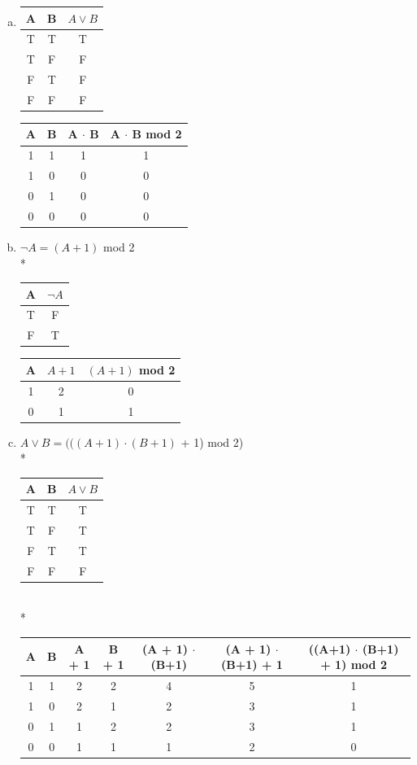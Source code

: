 \documentclass[12pt]{article}
\begin{document}
\begin{enumerate}[(a)]
\item 
\begin{tabular}{c|c|c}
A & B & $A \lor B$\\
\hline
T & T & T\\
T & F & F\\
F & T & F\\
F & F & F\\
\end{tabular}
\hspace{1in}
\begin{tabular}{c|c|c|c}
A & B & A $\cdot$ B & A $\cdot$ B mod 2\\
\hline
1 & 1 & 1 & 1\\
1 & 0 & 0 & 0\\
0 & 1 & 0 & 0\\
0 & 0 & 0 & 0\\
\end{tabular}
\medskip
\item $\neg A = (A + 1)$ mod 2
\vspace{0.1in}
\\*\begin{tabular}{c|c}
A & $\neg A$\\
\hline
T & F\\
F & T\\
\end{tabular}
\qquad\qquad
\begin{tabular}{c|c|c}
A & $A + 1$ & $(A + 1)$ mod 2\\
\hline
1 & 2 & 0\\
0 & 1 & 1\\
\end{tabular}
\medskip
\item $A \lor B = (((A+1) \cdot (B+1)$ + 1) mod 2)
\vspace{0.1in}
\\*\begin{tabular}{c|c|c}
A & B & $A \lor B$\\
\hline
T & T & T\\
T & F & T\\
F & T & T\\
F & F & F\\
\end{tabular}
\bigskip
\\*
\begin{tabular}{c|c|c|c|c|c|c}
A & B & A + 1 & B + 1 & (A + 1) $\cdot$ (B+1) & (A + 1) $\cdot$ (B+1) + 1 & ((A+1) $\cdot$ (B+1) + 1) mod 2\\
\hline
1 & 1 & 2 & 2 & 4 & 5 & 1\\
1 & 0 & 2 & 1 & 2 & 3 & 1\\
0 & 1 & 1 & 2 & 2 & 3 & 1\\
0 & 0 & 1 & 1 & 1 & 2 & 0\\
\end{tabular}
\end{enumerate}
\end{document}
